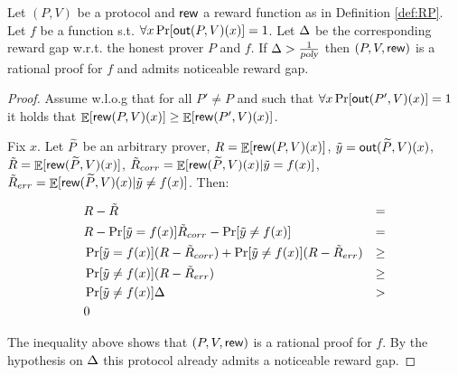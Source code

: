 \begin{lemma}
	\label{lemma:noticeable-gap-implies-rp}
	Let $(P,V)$ be a protocol and $\mathsf{rew}$ a reward function as in Definition \ref{def:RP}.
	Let $f$ be a function s.t. $\forall x \Pr[\mathsf{out}(P,V)(x)] = 1$.
	Let $\Delta$ be the corresponding reward gap w.r.t. the honest prover $P$ and $f$.
	If $\Delta > \frac{1}{{\textsl{poly}}}$ then $(P,V,\mathsf{rew})$ is a rational proof for $f$ and admits noticeable reward gap.
\end{lemma}
\begin{proof}
	Assume w.l.o.g that for all $P' \not = P$ and such that $\forall x \Pr[\mathsf{out}(P',V)(x)] = 1$ it holds that
	$\mathop{\mathbb{E}}[\mathsf{rew}(P,V)(x)] \geq \mathop{\mathbb{E}}[\mathsf{rew}(P',V)(x)]$.
	
	Fix $x$. Let $\widetilde{P}$ be an arbitrary prover, $R = \mathop{\mathbb{E}}[\mathsf{rew}(P,V)(x)] $, $\tilde{y} = \mathsf{out}(\widetilde{P}, V)(x)$, $\tilde{R} = \mathop{\mathbb{E}}[\mathsf{rew}(\widetilde{P},V)(x)]$, $\tilde{R}_{corr} = \mathop{\mathbb{E}}[\mathsf{rew}(\widetilde{P},V)(x) | \tilde{y} = f(x)]$, $\tilde{R}_{err} = \mathop{\mathbb{E}}[\mathsf{rew}(\widetilde{P},V)(x) | \tilde{y} \not = f(x)]$. Then:
	
	\begin{align}
	& R - \tilde{R} & =  \\
	& R - \Pr[\tilde{y} = f(x)]\tilde{R}_{corr} - \Pr[\tilde{y} \not = f(x)] & = \\
	& \Pr[\tilde{y} = f(x)](R-\tilde{R}_{corr}) + \Pr[\tilde{y} \not = f(x)](R-\tilde{R}_{err}) & \geq \\
	& \Pr[\tilde{y} \not = f(x)](R-\tilde{R}_{err}) & \geq \\
	& \Pr[\tilde{y} \not = f(x)]\Delta & > \\
	& 0 
	\end{align}
	
	The inequality above shows that $(P,V, \mathsf{rew})$ is a rational proof for $f$.
	By the hypothesis on $\Delta$ this protocol already admits a noticeable reward gap.
\end{proof}


